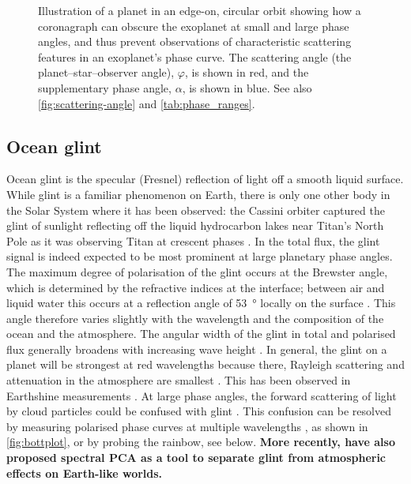 \documentclass[usenatbib]{mnras}
\begin{document}
\begin{figure}
    \centering
    
    \caption{
        Illustration of a planet in an edge-on, circular orbit showing how a coronagraph can obscure the exoplanet at small and large phase angles, and thus prevent observations of characteristic scattering features in an exoplanet's phase curve. 
        The scattering angle (the planet--star--observer angle), $\varphi$, is shown in red, and the supplementary phase angle, $\alpha$, is shown in blue. 
        See also \cref{fig:scattering-angle} and \cref{tab:phase_ranges}.
    }
    \label{fig:annotated-orbit}
\end{figure}

\subsection{Ocean glint}

Ocean glint is the specular (Fresnel) reflection of light off a smooth liquid surface. 
%
While glint is a familiar phenomenon on Earth, there is only one other body in the Solar System where it has been observed: the Cassini orbiter captured the glint of sunlight reflecting off the liquid hydrocarbon lakes near Titan's North Pole as it was observing Titan at crescent phases \citep{2010GeoRL..37.7104S}.
%
In the total flux, the glint signal is indeed expected to be most prominent at large planetary phase angles.
%
The maximum degree of polarisation of the glint occurs at the Brewster angle, which is determined by the refractive indices at the interface; between air and liquid water this occurs at a reflection angle of \qty{53}{\degree} locally on the surface \citep[at a planetary phase angle of about \qty{106}%
{\degree}; see, e.g.,][]{Zugger_2010,treesandstam2019}.
%
This angle therefore varies slightly with the wavelength and the composition of the ocean and the atmosphere.
%
The angular width of the glint in total and polarised flux generally broadens with increasing wave height \citep{2008Icar..195..927W, kopparla2018, treesandstam2019, trees2022}.
In general, the glint on a planet will be strongest at red wavelengths because there, Rayleigh scattering and attenuation in the atmosphere are smallest \citep{Robinson_2010,Zugger_2011}. 
%
This has been observed in Earthshine measurements \citep{Emde2017,sterzik2019, takahashi2021}. 
%
At large phase angles, the forward scattering of light by cloud particles could be confused with glint \citep{Robinson_2010}.  
%
This confusion can be resolved by measuring polarised phase curves at multiple wavelengths \citep{treesandstam2019}, as shown in \cref{fig:bottplot}, or by probing the rainbow, see below.
%
{\bf More recently, \citet{Ryan_Robinson_2022} have also proposed spectral PCA as a tool to separate glint from atmospheric effects on Earth-like worlds.}
\end{document}
